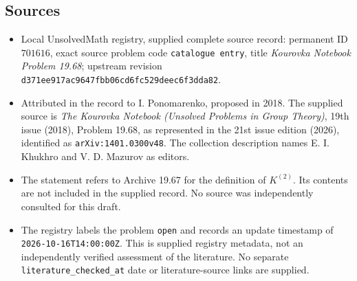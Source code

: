 \documentclass[11pt]{article}
\begin{document}
\subsection{Sources}
\begin{itemize}
\item Local UnsolvedMath registry, supplied complete source record: permanent ID \(701616\), exact source problem code \texttt{catalogue entry}, title \emph{Kourovka Notebook Problem 19.68}; upstream revision \texttt{d371ee917ac9647fbb06cd6fc529deec6f3dda82}.
\item Attributed in the record to I. Ponomarenko, proposed in 2018. The supplied source is \emph{The Kourovka Notebook (Unsolved Problems in Group Theory)}, 19th issue (2018), Problem 19.68, as represented in the 21st issue edition (2026), identified as \texttt{arXiv:1401.0300v48}. The collection description names E. I. Khukhro and V. D. Mazurov as editors.
\item The statement refers to Archive 19.67 for the definition of \(K^{(2)}\). Its contents are not included in the supplied record. No source was independently consulted for this draft.
\item The registry labels the problem \texttt{open} and records an update timestamp of \texttt{2026-10-16T14:00:00Z}. This is supplied registry metadata, not an independently verified assessment of the literature. No separate \texttt{literature\_checked\_at} date or literature-source links are supplied.
\end{itemize}
\end{document}
